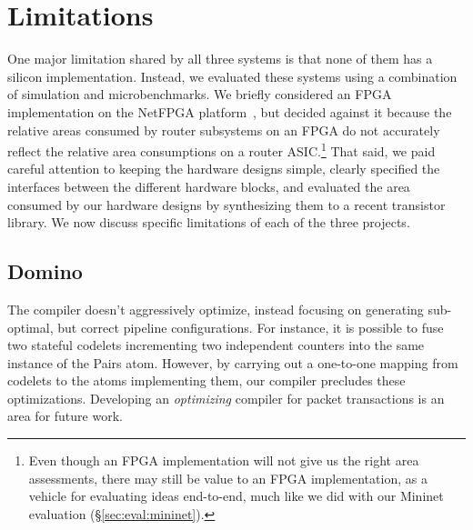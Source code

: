 \chapter{Limitations}
\label{chap:limitations}


One major limitation shared by all three systems is that none of them has a
silicon implementation. Instead, we evaluated these systems using a combination
of simulation and microbenchmarks. We briefly considered an FPGA implementation
on the NetFPGA platform~\cite{netfpga}, but decided against it because the
relative areas consumed by router subsystems on an FPGA do not accurately
reflect the relative area consumptions on a router ASIC.\footnote{ Even though
an FPGA implementation will not give us the right area assessments, there may
still be value to an FPGA implementation, as a vehicle for evaluating ideas
end-to-end, much like we did with our Mininet evaluation
(\S\ref{sec:eval:mininet}).} That said, we paid careful attention to keeping
the hardware designs simple, clearly specified the interfaces between the
different hardware blocks, and evaluated the area consumed by our hardware
designs by synthesizing them to a recent transistor library. We now discuss
specific limitations of each of the three projects.

\section{Domino}
\label{sec:domino_limitations}
The \pktlanguage compiler doesn't aggressively optimize, instead focusing on
generating sub-optimal, but correct pipeline configurations. For instance, it is
possible to fuse two stateful codelets incrementing two independent counters
into the same instance of the Pairs atom. However, by carrying out a one-to-one
mapping from codelets to the atoms implementing them, our compiler precludes
these optimizations.  Developing an {\em optimizing} compiler for packet
transactions is an area for future work.

